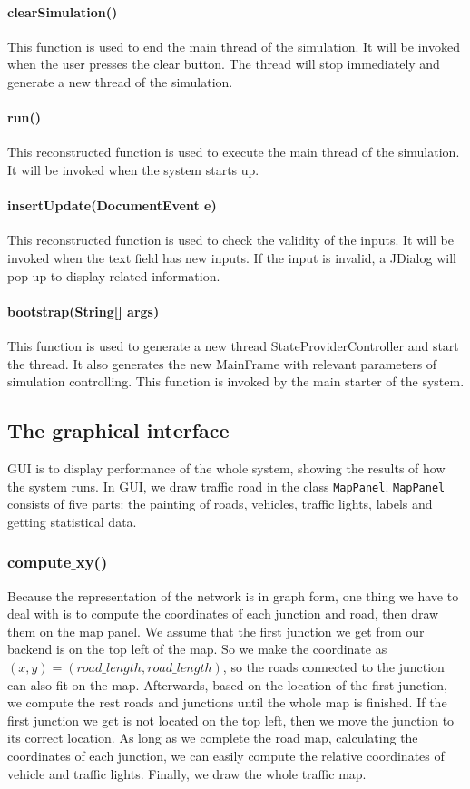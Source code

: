 \documentclass[a4paper,12pt]{article}
\begin{document}
\paragraph{clearSimulation()} This function is used to end the main thread of the simulation. It will be invoked when the user presses the clear button. The thread will stop immediately and generate a new thread of the simulation.
\paragraph{run()}This reconstructed function is used to execute the main thread of the simulation. It will be invoked when the system starts up.

\paragraph{insertUpdate(DocumentEvent e)} This reconstructed function is used to check the validity of the inputs. It will be invoked when the text field has new inputs.  If the input is invalid, a JDialog will pop up to display related information.

\paragraph{bootstrap(String[] args)} This function is used to generate a new thread StateProviderController and start the thread. It also generates the new MainFrame with relevant parameters of simulation controlling. This function is invoked by the main starter of the system.

\subsection{The graphical interface}

GUI is to display performance of the whole system, showing the results of how the system runs. In GUI, we draw traffic road in the class \verb|MapPanel|. \verb|MapPanel| consists of five parts: the painting of roads, vehicles, traffic lights, labels and getting statistical data.

\subsubsection{compute$\_$xy()}
Because the representation of the network is in graph form, one thing we have to deal with is to compute the coordinates of each junction and road, then draw them on the map panel. We assume that the first junction we get from our backend is on the top left of the map. So we make the coordinate as $(x,y)=(road\_length, road\_length)$, so the roads connected to the junction can also fit on the map. Afterwards, based on the location of the first junction, we compute the rest roads and junctions until the whole map is finished. If the first junction we get is not located on the top left, then we move the junction to its correct location. As long as we complete the road map, calculating the coordinates of each junction, we can easily compute the relative coordinates of vehicle and traffic lights. Finally, we draw the whole traffic map.
\end{document}
